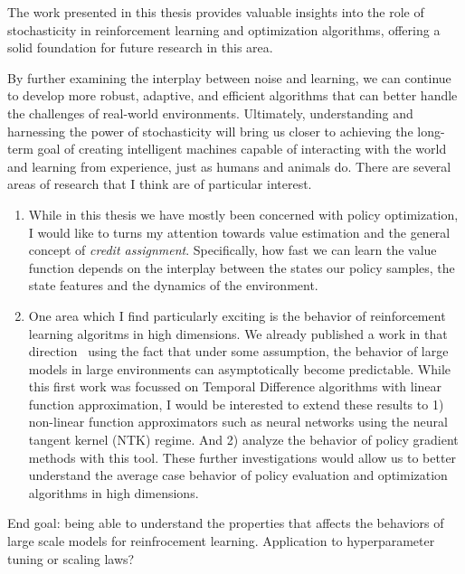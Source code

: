 The work presented in this thesis provides valuable insights into the role of stochasticity in reinforcement learning and optimization algorithms, offering a solid foundation for future research in this area.

By further examining the interplay between noise and learning, we can continue to develop more robust, adaptive, and efficient algorithms that can better handle the challenges of real-world environments. Ultimately, understanding and harnessing the power of stochasticity will bring us closer to achieving the long-term goal of creating intelligent machines capable of interacting with the world and learning from experience, just as humans and animals do.
There are several areas of research that I think are of particular interest.


\begin{enumerate}

\item While in this thesis we have mostly been concerned with policy
        optimization, I would like to turns my attention towards value
        estimation and the general concept of \emph{credit assignment}.
        Specifically, how fast we can learn the value function depends on the
        interplay between the states our policy samples, the state features and
        the dynamics of the environment. 

\item One area which I find particularly exciting is the behavior of
    reinforcement learning algoritms in high dimensions. We already published a
        work in that direction~\citep{thomas2022role} using the fact that under
        some assumption, the behavior of large models in large environments can
        asymptotically become predictable. While this first work was focussed on
        Temporal Difference algorithms with linear function approximation, I
        would be interested to extend these results to 1) non-linear function
        approximators such as neural networks using the neural tangent kernel
        (NTK) regime. And 2) analyze the behavior of policy gradient methods
        with this tool. These further investigations would allow us to better
        understand the average case behavior of policy evaluation and
        optimization algorithms in high dimensions.

\end{enumerate}
 
End goal: being able to understand the properties that affects the behaviors of
large scale models for reinfrocement learning.
 Application to hyperparameter tuning or scaling laws?






